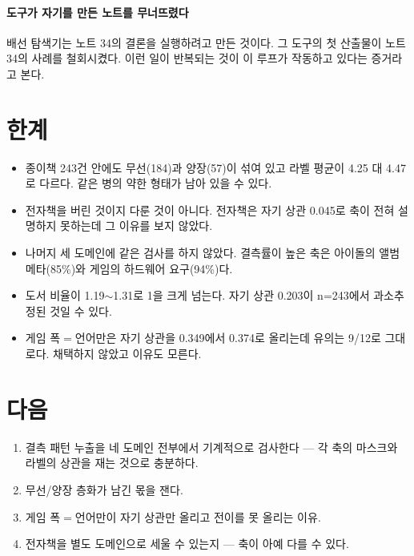 \documentclass[10pt]{article}
\begin{document}
\paragraph{도구가 자기를 만든 노트를 무너뜨렸다}
배선 탐색기는 노트 34의 결론을 실행하려고 만든 것이다. 그 도구의 첫 산출물이
노트 34의 사례를 철회시켰다. 이런 일이 반복되는 것이 이 루프가 작동하고 있다는
증거라고 본다.

\section{한계}

\begin{itemize}[leftmargin=1.1em,itemsep=0.15em]
\item 종이책 243건 안에도 무선(184)과 양장(57)이 섞여 있고 라벨 평균이 4.25 대
      4.47로 다르다. 같은 병의 약한 형태가 남아 있을 수 있다.
\item 전자책을 버린 것이지 다룬 것이 아니다. 전자책은 자기 상관 0.045로 축이
      전혀 설명하지 못하는데 그 이유를 보지 않았다.
\item 나머지 세 도메인에 같은 검사를 하지 않았다. 결측률이 높은 축은 아이돌의
      앨범 메타(85\%)와 게임의 하드웨어 요구(94\%)다.
\item 도서 비율이 1.19$\sim$1.31로 1을 크게 넘는다. 자기 상관 0.203이 n=243에서
      과소추정된 것일 수 있다.
\item 게임 폭$=$언어만은 자기 상관을 0.349에서 0.374로 올리는데 유의는 9/12로
      그대로다. 채택하지 않았고 이유도 모른다.
\end{itemize}

\section{다음}

\begin{enumerate}[leftmargin=1.3em,itemsep=0.15em]
\item 결측 패턴 누출을 네 도메인 전부에서 기계적으로 검사한다 --- 각 축의 마스크와
      라벨의 상관을 재는 것으로 충분하다.
\item 무선/양장 층화가 남긴 몫을 잰다.
\item 게임 폭$=$언어만이 자기 상관만 올리고 전이를 못 올리는 이유.
\item 전자책을 별도 도메인으로 세울 수 있는지 --- 축이 아예 다를 수 있다.
\end{enumerate}
\end{document}
